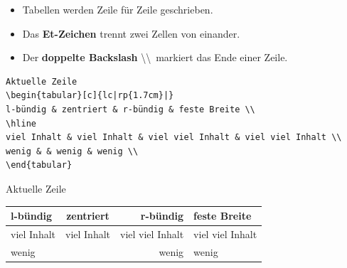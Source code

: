 \begin{frame}[fragile]

\begin{itemize}
	\item Tabellen werden Zeile für Zeile geschrieben. 
	
	\item Das \textbf{Et-Zeichen} \ltxterm{\&} trennt zwei Zellen von einander.
	
	\item Der \textbf{doppelte Backslash} \textbackslash\textbackslash\ markiert das Ende einer Zeile.
	
\end{itemize}

\small{
\begin{lstlisting}
Aktuelle Zeile
\begin{tabular}[c]{lc|rp{1.7cm}|}
l-bündig & zentriert & r-bündig & feste Breite \\
\hline
viel Inhalt & viel Inhalt & viel viel Inhalt & viel viel Inhalt \\
wenig & & wenig & wenig \\
\end{tabular}
\end{lstlisting}

Aktuelle Zeile
\begin{tabular}[c]{lc|rp{1.7cm}|}
	l-bündig & zentriert & r-bündig & feste Breite \\
	\hline
viel Inhalt & viel Inhalt & viel viel Inhalt & viel viel Inhalt \\
	wenig & & wenig & wenig \\
\end{tabular}
}
\end{frame}


